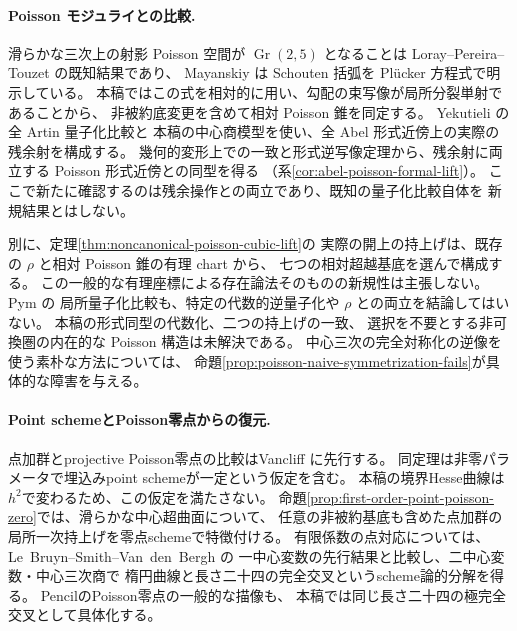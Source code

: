 \documentclass[11pt,a4paper]{ltjsarticle}
\numberwithin{equation}{section}
\begin{document}
\paragraph{Poisson モジュライとの比較.}
滑らかな三次上の射影 Poisson 空間が $\operatorname{Gr}(2,5)$ となることは
Loray--Pereira--Touzet の既知結果であり、
Mayanskiy \cite[Theorem~1 and \S2.2]{Mayanskiy} は Schouten 括弧を
Pl\"ucker 方程式で明示している。
本稿ではこの式を相対的に用い、勾配の束写像が局所分裂単射であることから、
非被約底変更を含めて相対 Poisson 錐を同定する。
Yekutieli \cite[Corollary~11.2]{YekutieliTwisted} の全 Artin 量子化比較と
本稿の中心商模型を使い、全 Abel 形式近傍上の実際の残余射を構成する。
幾何的変形上での一致と形式逆写像定理から、残余射に両立する
Poisson 形式近傍との同型を得る
（系\ref{cor:abel-poisson-formal-lift}）。
ここで新たに確認するのは残余操作との両立であり、既知の量子化比較自体を
新規結果とはしない。

別に、定理\ref{thm:noncanonical-poisson-cubic-lift}の
実際の開上の持上げは、既存の $\rho$ と相対 Poisson 錐の有理 chart から、
七つの相対超越基底を選んで構成する。
この一般的な有理座標による存在論法そのものの新規性は主張しない。
Pym \cite[Theorem~2.3, Proposition~2.9 and Theorem~2.10]{Pym} の
局所量子化比較も、特定の代数的逆量子化や $\rho$ との両立を結論してはいない。
本稿の形式同型の代数化、二つの持上げの一致、
選択を不要とする非可換圏の内在的な Poisson 構造は未解決である。
中心三次の完全対称化の逆像を使う素朴な方法については、
命題\ref{prop:poisson-naive-symmetrization-fails}が具体的な障害を与える。

\paragraph{Point schemeとPoisson零点からの復元.}
点加群とprojective Poisson零点の比較はVancliff
\cite[\S6, Proposition~6.17 and Theorem~6.18]{VancliffQuantumSpaces}に先行する。
同定理は非零パラメータで埋込みpoint schemeが一定という仮定を含む。
本稿の境界Hesse曲線は$h^2$で変わるため、この仮定を満たさない。
命題\ref{prop:first-order-point-poisson-zero}では、滑らかな中心超曲面について、
任意の非被約基底も含めた点加群の局所一次持上げを零点schemeで特徴付ける。
有限係数の点対応については、Le~Bruyn--Smith--Van~den~Bergh
\cite[Theorem~4.2.2 and Proposition~4.3.7(1)]{LeBruynSmithVdBCentral}の
一中心変数の先行結果と比較し、二中心変数・中心三次商で
楕円曲線と長さ二十四の完全交叉というscheme論的分解を得る。
PencilのPoisson零点の一般的な描像\cite[\S3.2.2]{PymSurvey}も、
本稿では同じ長さ二十四の極完全交叉として具体化する。
\end{document}
